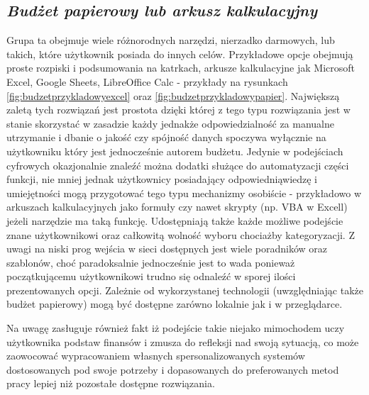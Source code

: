 \documentclass[a4paper,10pt, twoside]{report}
\newcommand{\customstylesection}[1]{\textbf{\textit{#1}}}
\begin{document}
\begin{large}
\section{\customstylesection{Budżet papierowy lub arkusz kalkulacyjny}}
{Grupa ta obejmuje wiele różnorodnych narzędzi, nierzadko darmowych, lub takich, 
które użytkownik posiada do innych celów. Przykładowe opcje obejmują proste 
rozpiski i podsumowania na katrkach, arkusze kalkulacyjne jak Microsoft 
Excel, Google Sheets, LibreOffice Calc - przykłady na rysunkach 
\ref{fig:budzetprzykladowyexcel} oraz \ref{fig:budzetprzykladowypapier}. Największą 
zaletą tych rozwiązań jest prostota dzięki której z tego typu rozwiązania jest 
w stanie skorzystać w zasadzie każdy jednakże odpowiedzialność za manualne 
utrzymanie i dbanie o jakość czy spójność danych spoczywa wyłącznie na 
użytkowniku który jest jednocześnie autorem budżetu. Jedynie w podejściach 
cyfrowych okazjonalnie znaleźć można dodatki służące do automatyzacji części 
funkcji, nie mniej jednak użytkownicy posiadający odpowiedniąwiedzę i 
umiejętności mogą przygotować tego typu mechanizmy osobiście - przykładowo w 
arkuszach kalkulacyjnych jako formuły czy nawet skrypty (np. VBA w Excell) 
jeżeli narzędzie ma taką funkcję. Udostępniają także każde możliwe podejście 
znane użytkownikowi oraz całkowitą wolność wyboru chociażby kategoryzacji. Z 
uwagi na niski prog wejścia w sieci dostępnych jest wiele poradników oraz 
szablonów, choć paradoksalnie jednocześnie jest to wada ponieważ początkującemu 
użytkownikowi trudno się odnaleźć w sporej ilości prezentowanych opcji. Zależnie
 od wykorzystanej technologii (uwzględniając także budżet papierowy) mogą być 
dostępne zarówno lokalnie jak i w przeglądarce.}

{Na uwagę zasługuje również fakt iż podejście takie niejako mimochodem uczy 
użytkownika podstaw finansów i zmusza do refleksji nad swoją sytuacją, co może 
zaowocować wypracowaniem własnych spersonalizowanych systemów dostosowanych pod 
swoje potrzeby i dopasowanych do preferowanych metod pracy lepiej niż pozostałe 
dostępne rozwiązania.}


\end{large}
\end{document}
